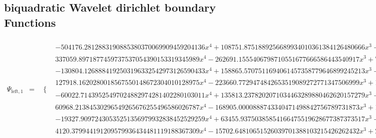 \documentclass{article}
\begin{document}
 \begin{landscape}
 \subsection{biquadratic Wavelet dirichlet boundary Functions}
 \begin{eqnarray*}
 \Psi_{\text{left},1} & = & \begin{array}{cc}
 \{ & 
\begin{array}{cc}
 -504176.2812883190885380370069909459204136 x^4+108751.8751889256689934010361384126480666 x^3-5569.461288816798649904411481791511934232 x^2-2.315674683890615103258070862710661158731 x & x\geq 0\land x<\frac{1}{8} \\
 337059.8971877459737537054390153319345989 x^4-262691.1555406798710551677666586443540917 x^3+75087.77314633644150817240001341562323382 x^2-9327.389862366199264000036172976493219288 x+425.4597284190219522009380930076118606592 & x\geq \frac{1}{8}\land x<\frac{1}{4} \\
 -130804.1268884192503196332542973126590433 x^4+158865.5707511694061457358779646899245213 x^3-71661.23914438034362134766603595015519768 x^2+14246.73160803078033017423181687150585915 x-1055.487375273048425475264952856106916396 & x\geq \frac{1}{4}\land x<\frac{3}{8} \\
 127918.1620280018567550148672304010128975 x^4-223660.7729474842653519089272771347506999 x^3+146137.6667936893446944935958658988757140 x^2-42298.37941595954551719640053287258514066 x+4576.911440449628186361039862141745718168 & x\geq \frac{3}{8}\land x<\frac{1}{2} \\
 -60022.71439525497024882974281402280103011 x^4+135813.2378202071034463289880462620157279 x^3-115113.6762536293068813738255809162301558 x^2+43317.89376721899296191488944360685287218 x-6106.335958817847571267201052042304253786 & x\geq \frac{1}{2}\land x<\frac{5}{8} \\
 60968.21384530296549265676255496586026787 x^4-168905.0000888743340471498842756789731873 x^3+175189.1011732544988097484822685134799484 x^2-80624.09632660081371186285726530867792192 x+13890.23594447740233940788329416357911293 & x\geq \frac{5}{8}\land x<\frac{3}{4} \\
 -19327.90972430535251356979932838452529259 x^4+63455.93750385854166475519628677387373517 x^3-78050.14483116904570276336002029234952673 x^2+42625.39901601181192857240589691466274230 x-8720.884883731623174432985556431609169672 & x\geq \frac{3}{4}\land x<\frac{7}{8} \\
 4120.379944191209579936434481119188367309 x^4-15702.64810651526039701388103215426262432 x^3+22421.96551414806218750406302029761132205 x^2-14217.50648551518150371222086860918824037 x+3377.809133691170133285604399346651175334 & x\geq \frac{7}{8}\land x<1
\end{array}


\end{array}
\end{eqnarray*}
\end{landscape}
\end{document}
